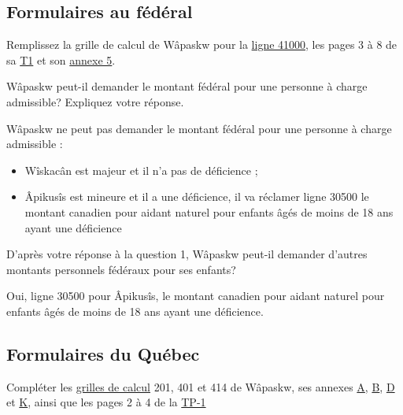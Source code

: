 \subsection{Formulaires au fédéral}
Remplissez la grille de calcul de Wâpaskw pour la  \href{https://www.canada.ca/fr/agence-revenu/services/formulaires-publications/trousses-impot-toutes-annees-imposition/trousse-generale-impot-prestations/5000-d1.html}{ligne 41000}, les pages 3 à 8 de sa \href{https://www.canada.ca/fr/agence-revenu/services/formulaires-publications/trousses-impot-toutes-annees-imposition/trousse-generale-impot-prestations/quebec/5005-r.html}{T1} et son \href{https://www.canada.ca/fr/agence-revenu/services/formulaires-publications/trousses-impot-toutes-annees-imposition/trousse-generale-impot-prestations/5000-s5.html}{annexe 5}.

\setcounter{question}{0}
\begin{question}
	 Wâpaskw peut-il demander le montant fédéral pour une personne à charge admissible? Expliquez votre réponse.
\end{question}
Wâpaskw ne peut pas demander le montant fédéral pour une personne à charge admissible :
\begin{itemize}
	\item Wîskacân est majeur et il n'a pas de déficience ;
	\item Âpikusîs est mineure et il a une déficience, il va réclamer ligne 30500 le montant canadien pour aidant naturel pour enfants âgés de moins de 18 ans ayant une déficience
\end{itemize}

\begin{question}
	 D'après votre réponse à la question 1, Wâpaskw peut-il demander d'autres montants personnels fédéraux pour ses enfants?
\end{question}
Oui, ligne 30500 pour Âpikusîs, le montant canadien pour aidant naturel pour enfants âgés de moins de 18 ans ayant une déficience.


\subsection{Formulaires du Québec}
Compléter les \href{https://www.revenuquebec.ca/documents/fr/formulaires/tp/2023-12/TP-1.D.GR%282023-12%29.pdf}{grilles de calcul} 201, 401 et 414 de Wâpaskw, ses annexes \href{https://www.revenuquebec.ca/documents/fr/formulaires/tp/2023-12/TP-1.D.A%282023-12%29.pdf}{A}, \href{https://www.revenuquebec.ca/documents/fr/formulaires/tp/2023-12/TP-1.D.B%282023-12%29.pdf}{B}, \href{https://www.revenuquebec.ca/documents/fr/formulaires/tp/2023-12/TP-1.D.D%282023-12%29.pdf}{D} et \href{https://www.revenuquebec.ca/documents/fr/formulaires/tp/2023-12/TP-1.D.K%282023-12%29.pdf}{K}, ainsi que les pages 2 à 4 de la \href{https://www.revenuquebec.ca/documents/fr/formulaires/tp/2023-12/TP-1.D%282023-12%29.pdf}{TP-1}

